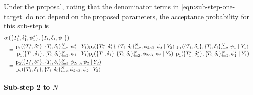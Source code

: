 \documentclass[
  10pt,
  a4paper,
]{article}
\let\Oldcap\cap
\renewcommand{\cap}{\mathrel{\mathsmaller{\Oldcap}}}
\newcommand{\pd}{\text{p}}
\begin{document}
Under the proposal, noting that the denominator terms in
\eqref{eqn:sub-step-one-target} do not depend on the proposed
parameters, the acceptance probability for this sub-step is
\begin{equation}
\begin{aligned}
\alpha&\left(\{T_{1}^{*}, \delta_{1}^{*}, \psi_{1}^{*}\}, \{T_{1}, \delta_{1}, \psi_{1}\} \right) \\
&=
\frac {
  \pd_{1}(\{T_{1}^{*}, \delta_{1}^{*}\}, \{T_{i}, \delta_{i}\}_{i = 2}^{N}, \psi_{1}^{*} \mid Y_{1})
  \pd_{2}(\{T_{1}^{*}, \delta_{1}^{*}\}, \{T_{i}, \delta_{i}\}_{i = 2}^{N}, \phi_{2 \cap 3}, \psi_{2} \mid Y_{2})
} {
  \pd_{1}(\{T_{1}, \delta_{1}\}, \{T_{i}, \delta_{i}\}_{i = 2}^{N}, \psi_{1} \mid Y_{1})
  \pd_{2}(\{T_{1}, \delta_{1}\}, \{T_{i}, \delta_{i}\}_{i = 2}^{N}, \phi_{2 \cap 3}, \psi_{2} \mid Y_{2})
}
\frac{
  \pd_{1}(\{T_{1}, \delta_{1}\}, \{T_{i}, \delta_{i}\}_{i = 2}^{N}, \psi_{1} \mid Y_{1})
} {
  \pd_{1}(\{T_{1}^{*}, \delta_{1}^{*}\}, \{T_{i}, \delta_{i}\}_{i = 2}^{N}, \psi_{1}^{*} \mid Y_{1})
} \\
&= \frac {
  \pd_{2}(\{T_{1}^{*}, \delta_{1}^{*}\}, \{T_{i}, \delta_{i}\}_{i = 2}^{N}, \phi_{2 \cap 3}, \psi_{2} \mid Y_{2})
} {
  \pd_{2}(\{T_{1}, \delta_{1}\}, \{T_{i}, \delta_{i}\}_{i = 2}^{N}, \phi_{2 \cap 3}, \psi_{2} \mid Y_{2})
}
\end{aligned}
\end{equation}

\hypertarget{sub-step-2-to-n}{%
\paragraph{\texorpdfstring{Sub-step 2 to
\(N\)}{Sub-step 2 to N}}\label{sub-step-2-to-n}}
\end{document}
